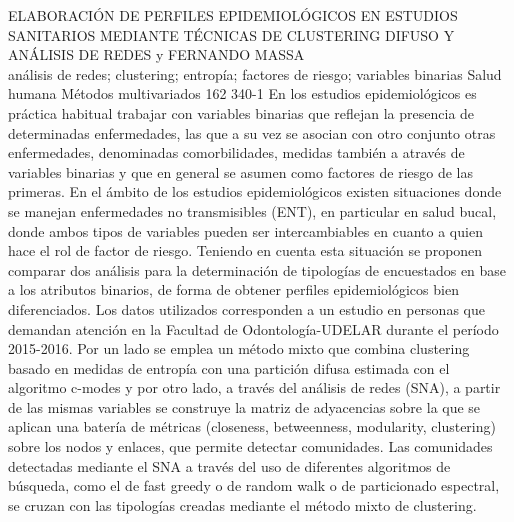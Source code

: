 \A
{ELABORACIÓN DE PERFILES EPIDEMIOLÓGICOS EN ESTUDIOS SANITARIOS MEDIANTE TÉCNICAS DE CLUSTERING DIFUSO Y ANÁLISIS DE REDES}
{ y FERNANDO MASSA}
{
\\}
{análisis de redes; clustering; entropía; factores de riesgo; variables binarias} 
 {Salud humana} 
 {Métodos multivariados} 
 {162} 
 {340-1}
{En los estudios epidemiológicos es práctica habitual trabajar con variables binarias que reflejan la presencia de determinadas enfermedades, las que a su vez se asocian con otro conjunto otras enfermedades, denominadas comorbilidades, medidas también a através de variables binarias y que en general se asumen como factores de riesgo de las primeras. En el ámbito de los estudios epidemiológicos existen situaciones donde se manejan enfermedades no transmisibles (ENT), en particular en salud bucal, donde ambos tipos de variables pueden ser intercambiables en cuanto a quien hace el rol de factor de riesgo. Teniendo en cuenta esta situación se proponen comparar dos análisis para la determinación de tipologías de encuestados en base a los atributos binarios, de forma de obtener perfiles epidemiológicos bien diferenciados. Los datos utilizados corresponden a un estudio en personas que demandan atención en la Facultad de Odontología-UDELAR durante el período 2015-2016. Por un lado se emplea un método mixto que combina clustering basado en medidas de entropía con una partición difusa estimada con el algoritmo c-modes y por otro lado, a través del análisis de redes (SNA), a partir de las mismas variables se construye la matriz de adyacencias sobre la que se aplican una batería de métricas (closeness, betweenness, modularity, clustering) sobre los nodos y enlaces, que permite detectar comunidades. Las comunidades detectadas mediante el SNA a través del uso de diferentes algoritmos de búsqueda, como el de fast greedy o de random walk o de particionado espectral, se cruzan con las tipologías creadas mediante el método mixto de clustering.}
